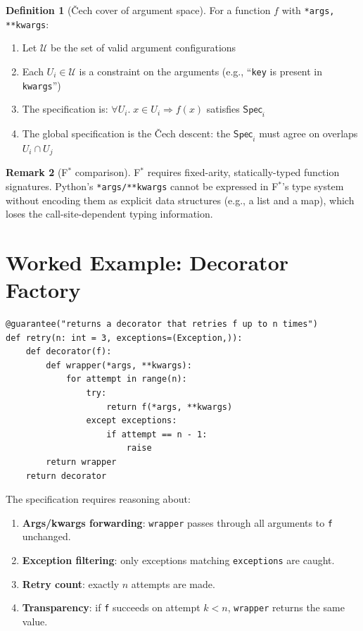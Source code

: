 \documentclass[11pt,a4paper]{report}
\theoremstyle{definition}
\newtheorem{definition}{Definition}[chapter]
\newtheorem{remark}[definition]{Remark}
\theoremstyle{plain}
\newcommand{\Spec}{\mathsf{Spec}}
\newcommand{\fstar}{F$^{*}$}
\begin{document}
\begin{definition}[\v{C}ech cover of argument space]
For a function $f$ with \texttt{*args, **kwargs}:
\begin{enumerate}
  \item Let $\mathcal{U}$ be the set of valid argument configurations
  \item Each $U_i \in \mathcal{U}$ is a constraint on the arguments (e.g.,
    ``\texttt{key} is present in \texttt{kwargs}'')
  \item The specification is: $\forall U_i.\; x \in U_i \Rightarrow f(x)$ satisfies
    $\Spec_i$
  \item The global specification is the \v{C}ech descent: the $\Spec_i$ must
    agree on overlaps $U_i \cap U_j$
\end{enumerate}
\end{definition}

\begin{remark}[\fstar{} comparison]
\fstar{} requires fixed-arity, statically-typed function signatures. Python's
\texttt{*args/**kwargs} cannot be expressed in \fstar{}'s type system without
encoding them as explicit data structures (e.g., a list and a map), which loses
the call-site-dependent typing information.
\end{remark}

\section{Worked Example: Decorator Factory}

\begin{lstlisting}[style=synhopy]
@guarantee("returns a decorator that retries f up to n times")
def retry(n: int = 3, exceptions=(Exception,)):
    def decorator(f):
        def wrapper(*args, **kwargs):
            for attempt in range(n):
                try:
                    return f(*args, **kwargs)
                except exceptions:
                    if attempt == n - 1:
                        raise
        return wrapper
    return decorator
\end{lstlisting}

The specification requires reasoning about:
\begin{enumerate}
  \item \textbf{Args/kwargs forwarding}: \texttt{wrapper} passes through
    all arguments to \texttt{f} unchanged.
  \item \textbf{Exception filtering}: only exceptions matching
    \texttt{exceptions} are caught.
  \item \textbf{Retry count}: exactly $n$ attempts are made.
  \item \textbf{Transparency}: if \texttt{f} succeeds on attempt $k < n$,
    \texttt{wrapper} returns the same value.
\end{enumerate}
\end{document}
